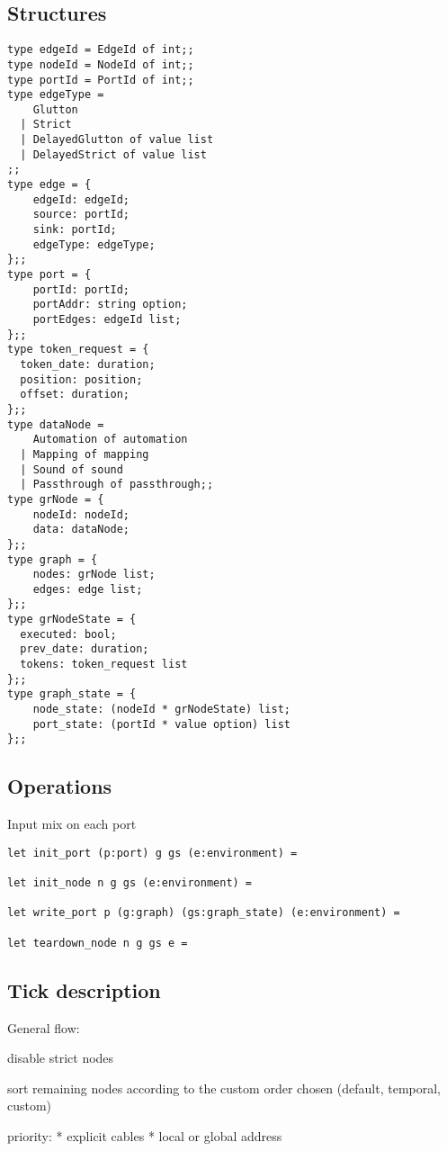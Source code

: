 \documentclass[applsci,article,submit,moreauthors,pdftex,10pt,a4paper]{mdpi}
\begin{document}
\subsection{Structures}
\begin{lstlisting}
type edgeId = EdgeId of int;;
type nodeId = NodeId of int;;
type portId = PortId of int;;
type edgeType =
    Glutton
  | Strict
  | DelayedGlutton of value list
  | DelayedStrict of value list
;;
type edge = {
    edgeId: edgeId;
    source: portId;
    sink: portId;
    edgeType: edgeType;
};;
type port = {
    portId: portId;
    portAddr: string option;
    portEdges: edgeId list;
};;
type token_request = {
  token_date: duration;
  position: position;
  offset: duration;
};;
type dataNode =
    Automation of automation
  | Mapping of mapping
  | Sound of sound
  | Passthrough of passthrough;;
type grNode = {
    nodeId: nodeId;
    data: dataNode;
};;
type graph = {
    nodes: grNode list;
    edges: edge list;
};;
type grNodeState = {
  executed: bool;
  prev_date: duration;
  tokens: token_request list
};;
type graph_state = {
    node_state: (nodeId * grNodeState) list;
    port_state: (portId * value option) list
};;
\end{lstlisting}


\subsection{Operations}
Input mix on each port

\begin{lstlisting}
let init_port (p:port) g gs (e:environment) =

let init_node n g gs (e:environment) =

let write_port p (g:graph) (gs:graph_state) (e:environment) =

let teardown_node n g gs e =
\end{lstlisting}



\subsection{Tick description}

General flow: 

disable strict nodes

sort remaining nodes according to the custom order chosen (default, temporal, custom)

priority: 
* explicit cables
* local or global address
\end{document}
